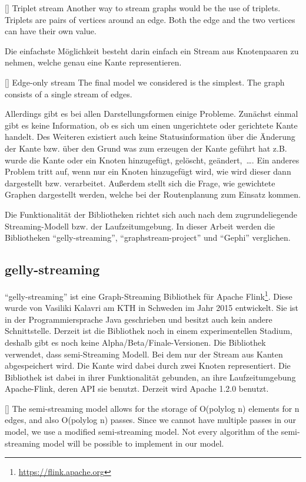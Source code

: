 [\cite{Bali2015}]{
Triplet stream Another way to stream graphs would be the use of triplets.
Triplets are pairs of vertices around an edge. Both the edge and the two vertices
can have their own value.
}

Die einfachste Möglichkeit besteht darin einfach ein Stream aus Knotenpaaren zu
nehmen, welche genau eine Kante representieren.

[\cite{Bali2015}]{
Edge-only stream The final model we considered is the simplest. The graph
consists of a single stream of edges.
}

Allerdings gibt es bei allen Darstellungsformen einige Probleme. Zunächst einmal
gibt es keine Information, ob es sich um einen ungerichtete oder gerichtete
Kante handelt. Des Weiteren existiert auch keine Statusinformation über die
Änderung der Kante bzw. über den Grund was zum erzeugen der Kante geführt hat
z.B. wurde die Kante oder ein Knoten hinzugefügt, gelöscht, geändert,~\dots .
Ein anderes Problem tritt auf, wenn nur ein Knoten hinzugefügt wird, wie wird
dieser dann dargestellt bzw. verarbeitet. Außerdem stellt sich die Frage, wie
gewichtete Graphen dargestellt werden, welche bei der Routenplanung zum Einsatz
kommen.

Die Funktionalität der Bibliotheken richtet sich auch nach dem zugrundeliegende
Streaming-Modell bzw. der Laufzeitumgebung. In dieser Arbeit werden die
Bibliotheken \enquote{gelly-streaming}, \enquote{graphstream-project} und
\enquote{Gephi} verglichen.

\subsection{gelly-streaming}
\enquote{gelly-streaming} ist eine Graph-Streaming Bibliothek für Apache Flink\footnote{\url{https://flink.apache.org}}.
Diese wurde von Vasiliki Kalavri am KTH in Schweden im Jahr 2015 entwickelt.
Sie ist in der Programmiersprache Java geschrieben und besitzt auch kein andere
Schnittstelle. Derzeit ist die Bibliothek noch in einem experimentellen Stadium,
deshalb gibt es noch keine Alpha/Beta/Finale-Versionen. Die Bibliothek verwendet,
dass semi-Streaming Modell. Bei dem nur der Stream aus Kanten abgespeichert wird.
Die Kante wird dabei durch zwei Knoten representiert. Die Bibliothek ist dabei
in ihrer Funktionalität gebunden, an ihre Laufzeitumgebung
Apache-Flink, deren \gls{API} sie benutzt. Derzeit wird Apache 1.2.0 benutzt.

[\cite{Bali2015}]{
The semi-streaming model allows for the storage of O(polylog n) elements for n
edges, and also O(polylog n) passes. Since we cannot have multiple passes in our
model, we use a modified semi-streaming model. Not every algorithm of the
semi-streaming model will be possible to implement in our model.
}

